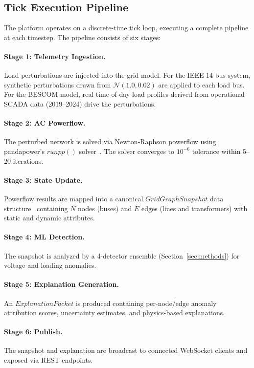 \documentclass[conference]{IEEEtran}
\begin{document}
\subsection{Tick Execution Pipeline}

The platform operates on a discrete-time tick loop, executing a complete pipeline at each timestep. The pipeline consists of six stages:

\paragraph{Stage 1: Telemetry Ingestion.}
Load perturbations are injected into the grid model. For the IEEE 14-bus system, synthetic perturbations drawn from $\mathcal{N}(1.0, 0.02)$ are applied to each load bus. For the BESCOM model, real time-of-day load profiles derived from operational SCADA data (2019--2024) drive the perturbations.

\paragraph{Stage 2: AC Powerflow.}
The perturbed network is solved via Newton-Raphson powerflow using pandapower's $runpp()$ solver~\cite{pandapower_2018}. The solver converges to $10^{-6}$ tolerance within 5--20 iterations.

\paragraph{Stage 3: State Update.}
Powerflow results are mapped into a canonical $GridGraphSnapshot$ data structure~\cite{pydantic_schema_2024} containing $N$ nodes (buses) and $E$ edges (lines and transformers) with static and dynamic attributes.

\paragraph{Stage 4: ML Detection.}
The snapshot is analyzed by a 4-detector ensemble (Section~\ref{sec:methods}) for voltage and loading anomalies.

\paragraph{Stage 5: Explanation Generation.}
An $ExplanationPacket$ is produced containing per-node/edge anomaly attribution scores, uncertainty estimates, and physics-based explanations.

\paragraph{Stage 6: Publish.}
The snapshot and explanation are broadcast to connected WebSocket clients and exposed via REST endpoints.
\end{document}
